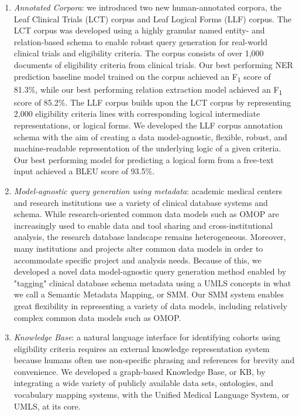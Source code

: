 \documentclass[../main.tex]{subfiles}
\begin{document}
\begin{enumerate}
    \item \textit{Annotated Corpora}: we introduced two new human-annotated corpora, the Leaf Clinical Trials (LCT) corpus and Leaf Logical Forms (LLF) corpus. The LCT corpus was developed using a highly granular named entity- and relation-based schema to enable robust query generation for real-world clinical trials and eligibility criteria. The corpus consists of over 1,000 documents of eligibility criteria from clinical trials. Our best performing NER prediction baseline model trained on the corpus achieved an F\textsubscript{1} score of 81.3\%, while our best performing relation extraction model achieved an F\textsubscript{1} score of 85.2\%. The LLF corpus builds upon the LCT corpus by representing 2,000 eligibility criteria lines with corresponding logical intermediate representations, or logical forms. We developed the LLF corpus annotation schema with the aim of creating a data model-agnostic, flexible, robust, and machine-readable representation of the underlying logic of a given criteria. Our best performing model for predicting a logical form from a free-text input achieved a BLEU score of 93.5\%.
    \item \textit{Model-agnostic query generation using metadata}: academic medical centers and research institutions use a variety of clinical database systems and schema. While research-oriented common data models such as OMOP are increasingly used to enable data and tool sharing and cross-institutional analysis, the research database landscape remains heterogeneous. Moreover, many institutions and projects alter common data models in order to accommodate specific project and analysis needs. Because of this, we developed a novel data model-agnostic query generation method enabled by "tagging" clinical database schema metadata using a UMLS concepts in what we call a Semantic Metadata Mapping, or SMM. Our SMM system enables great flexibility in representing a variety of data models, including relatively complex common data models such as OMOP.
    \item \textit{Knowledge Base}: a natural language interface for identifying cohorts using eligibility criteria requires an external knowledge representation system because humans often use non-specific phrasing and references for brevity and convenience. We developed a graph-based Knowledge Base, or KB, by integrating a wide variety of publicly available data sets, ontologies, and vocabulary mapping systems, with the Unified Medical Language System, or UMLS, at its core. 

\end{enumerate}
\end{document}
